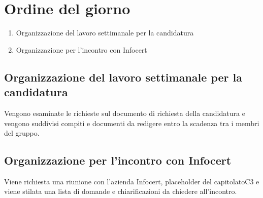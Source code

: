\section{Ordine del giorno}
\begin{enumerate}
\item Organizzazione del lavoro settimanale per la candidatura
\item Organizzazione per l'incontro con Infocert
\end{enumerate}

\subsection{Organizzazione del lavoro settimanale per la candidatura}
Vengono esaminate le richieste sul documento di richiesta della candidatura e vengono
suddivisi compiti e documenti da redigere entro la scadenza tra i membri del gruppo.

\subsection{Organizzazione per l'incontro con Infocert}
Viene richiesta una riunione con l’azienda Infocert, placeholder del capitolato\glo C3 e viene
stilata una lista di domande e chiarificazioni da chiedere all’incontro.
